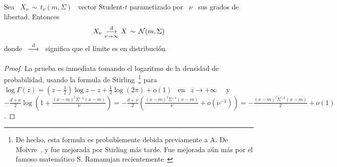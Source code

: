\begin{lema}
\label{Lem:MP:LimiteGaussiana}
%
  Sea \ $X_\nu \, \sim \, t_\nu(m,\Sigma)$ \ vector Student-$t$ parametizado por
  \ $\nu$ \ sus grados de libertad. Entonces
  \[
  X_\nu \, \mathop{\longrightarrow}_{\nu \to \infty}^{\mathrm{d}} \, X \, \sim \, \mathcal{N}(m,\Sigma)
  \]
  donde  \  $\displaystyle  \mathop{\longrightarrow}_{}^{\mathrm{d}}$  \   significa  que  el  l\'imite  es  en
  distribuci\'on.
\end{lema}
\begin{proof}
  La prueba  es inmediata tomando el  logaritmo de la  densidad de probabilidad,
  usando   la  formula   de   Stirling~\footnote{De  hecho,   esta  formula   es
    probablemente debida previamente a  A.  De Moivre~\cite{Dem56, Pea24, Cam86,
      Dut91}, y fue mejorada por  Stirling m\'as tarde. Fue mejorada a\'un m\'as
    por         el        famoso        matem\'atico         S.        Ramanujan
    recientemente~\cite[\S~4.1]{AndBer13}}  para \ $\log\Gamma(z)  = \left(  z -
    \frac12 \right)  \log z  - z +  \frac12 \log(2 \pi)  + o(1)$  \ en \  $z \to
  +\infty$~\cite{Sti30, AbrSte70, GraRyz15} \ y \ $-\frac{d+\nu}{2} \log\left( 1
    +  \frac{(x-m)^t \Sigma^{-1} (x-m)}{\nu}  \right) =  -\frac{d+\nu}{2} \left(
    \frac{(x-m)^t \Sigma^{-1} (x-m)}{\nu} + o\left( \nu^{-1} \right) \right) = -
  \frac{(x-m)^t \Sigma^{-1} (x-m)}{2} + o(1)$.
\end{proof}










